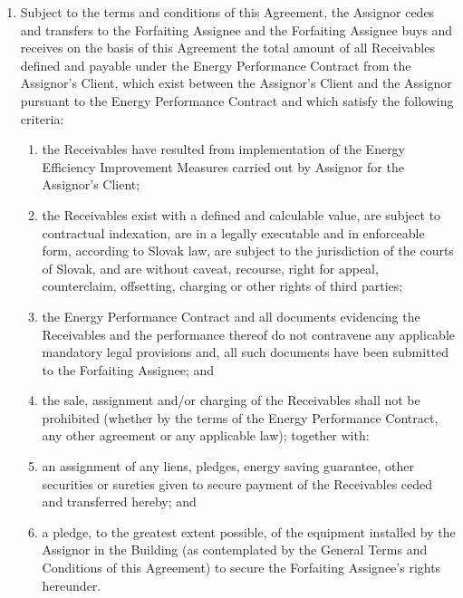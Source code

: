 \documentclass[a4paper]{article}
\begin{document}
\begin{enumerate}
\item{Subject to the terms and conditions of this Agreement, the
    Assignor cedes and transfers to the Forfaiting Assignee and the
    Forfaiting Assignee buys and receives on the basis of this
    Agreement the total amount of all Receivables defined and payable
    under the Energy Performance Contract from the Assignor’s Client,
    which exist between the Assignor’s Client and the Assignor
    pursuant to the Energy Performance Contract and which satisfy the
    following criteria:}

  \begin{enumerate}
  \item{the Receivables have resulted from implementation of the
      Energy Efficiency Improvement Measures carried out by Assignor
      for the Assignor’s Client;}

  \item{the Receivables exist with a defined and calculable value, are
      subject to contractual indexation, are in a legally executable
      and in enforceable form, according to Slovak law, are subject
      to the jurisdiction of the courts of Slovak, and are without
      caveat, recourse, right for appeal, counterclaim, offsetting,
      charging or other rights of third parties;}

  \item{the Energy Performance Contract and all documents evidencing
      the Receivables and the performance thereof do not contravene
      any applicable mandatory legal provisions and, all such
      documents have been submitted to the Forfaiting Assignee; and}

  \item{the sale, assignment and/or charging of the Receivables shall
      not be prohibited (whether by the terms of the Energy
      Performance Contract, any other agreement or any applicable
      law); together with:}

  \item{an assignment of any liens, pledges, energy saving guarantee,
      other securities or sureties given to secure payment of the
      Receivables ceded and transferred hereby; and }

  \item{a pledge, to the greatest extent possible, of the equipment
      installed by the Assignor in the Building (as contemplated by
      the General Terms and Conditions of this Agreement) to secure
      the Forfaiting Assignee's rights hereunder.}
  \end{enumerate}


\end{enumerate}
\end{document}
